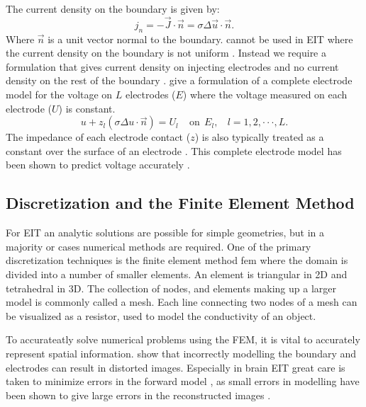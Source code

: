 The current density on the boundary is given by:
\begin{equation} \label{eq:cur_den}
	j_n = -\vec{J} \cdot \vec{n}  = \sigma \Delta \vec{u} \cdot \vec{n}.
\end{equation}
Where $\vec{n}$ is a unit vector normal to the boundary.  cannot be 
used in EIT where the current density on the boundary is not 
uniform \parencite{somersalo_existence_1992}. Instead
we require a formulation that gives current density on injecting electrodes 
and no current density on the rest of the boundary \parencite{somersalo_existence_1992}.
 give 
a formulation of a complete electrode model for the voltage on $L$ electrodes ($E$)
where the voltage measured on each electrode ($U$) is constant. 
\begin{equation} \label{eq:comp_elec}
	u + z_l (\sigma \Delta u \cdot \vec{n}) = U_l ~~~~~ \text{on} ~~ E_l, ~~~~ l= 1,2,\cdot\cdot\cdot,L.
\end{equation}
The impedance of each electrode contact ($z$) is also typically treated as a constant over the surface of 
an electrode \parencite{somersalo_existence_1992}.
This complete electrode model has been shown to predict voltage accurately \parencite{somersalo_existence_1992}.

\subsection{Discretization and the Finite Element Method}
For EIT an analytic solutions are possible for simple geometries, but in a majority or cases
numerical methods are required. 
One of the primary discretization techniques is the finite element method \acrshort{fem}
where the domain is divided into a number of smaller elements. 
An element is
triangular in 2D and tetrahedral in 3D. 
The collection of nodes, and elements making up a larger model is commonly called a mesh. 
Each line connecting two nodes of a mesh can be visualized as a resistor,
used to model the conductivity of an object.

To accurateatly solve numerical problems using the FEM, it is vital to accurately represent 
spatial information.  show that incorrectly modelling 
the boundary and electrodes can result in distorted images. 
Especially in brain EIT great care is taken to minimize errors in the forward model 
\parencite{aristovich_method_2014,malone_multifrequency_2014}, 
as small errors
in modelling have been shown to give large errors in the reconstructed 
images \parencite{kolehmainen_assessment_1997}. 

